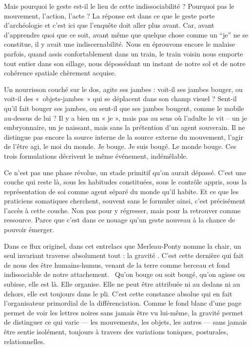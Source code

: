 \documentclass[
  french,
  letterpaper,
  DIV=11,
  numbers=noendperiod]{scrreprt}
\begin{document}
Mais pourquoi le geste est-il le lieu de cette indissociabilité ?
Pourquoi pas le mouvement, l'action, l'acte ? La réponse est dans ce que
le geste porte d'archéologie et c'est ici que l'enquête doit aller plus
avant. Car, avant d'apprendre quoi que ce soit, avant même que quelque
chose comme un ``je'' ne se constitue, il y avait une indiscernabilité.
Nous en éprouvons encore le malaise parfois, quand assis confortablement
dans un train, le train voisin nous emporte tout entier dans son
sillage, nous dépossédant un instant de notre sol et de notre cohérence
spatiale chèrement acquise.~

Un nourrisson couché sur le dos, agite ses jambes : voit-il ses jambes
bouger, ou voit-il des «~objets-jambes~» qui se déplacent dans son champ
visuel ? Sent-il qu'il fait bouger ses jambes, ou sent-il que ses jambes
bougent, comme le mobile au-dessus de lui ? Il y a bien un « je », mais
pas au sens où l'adulte le vit -- un je embryonnaire, un je naissant,
mais sans la prétention d'un agent souverain. Il ne distingue pas encore
la source interne de la source externe du mouvement, l'agir de l'être
agi, le moi du monde. Je bouge. Je suis bougé. Le monde bouge. Ces trois
formulations décrivent le même événement, indémêlable.

Ce n'est pas une phase révolue, un stade primitif qu'on aurait dépassé.
C'est une couche qui reste là, sous les habitudes constituées, sous le
contrôle appris, sous la représentation de soi comme agent séparé du
monde qu'il habite. Et ce que les praticiens somatiques cherchent,
souvent sans le formuler ainsi, c'est précisément l'accès à cette
couche. Non pas pour y régresser, mais pour la retrouver comme
ressource. Parce que c'est dans ce nouage qu'un geste nouveau à la
chance de pouvoir émerger.~

Dans ce flux originel, dans cet entrelacs que Merleau-Ponty nomme la
chair, un seul invariant traverse absolument tout : la gravité . C'est
cette dernière qui fait de nous des être humains-humus, venant de la
terre comme berceau et fond indissociable de notre attachement.~ Qu'on
bouge ou soit bougé, qu'on agisse ou subisse, elle est là. Elle
organise. Elle ne peut être attribuée ni au dedans ni au dehors, elle
est toujours dans le pli. C'est cette constance absolue qui en fait
l'organisateur primordial de la différenciation. Comme le fond blanc
d'une page permet de voir les lettres noires sans jamais être vu
lui-même, la gravité permet de distinguer ce qui varie --- les
mouvements, les objets, les autres --- sans jamais être sentie
isolément, toujours à travers des variations toniques, posturales,
relationnelles.
\end{document}
